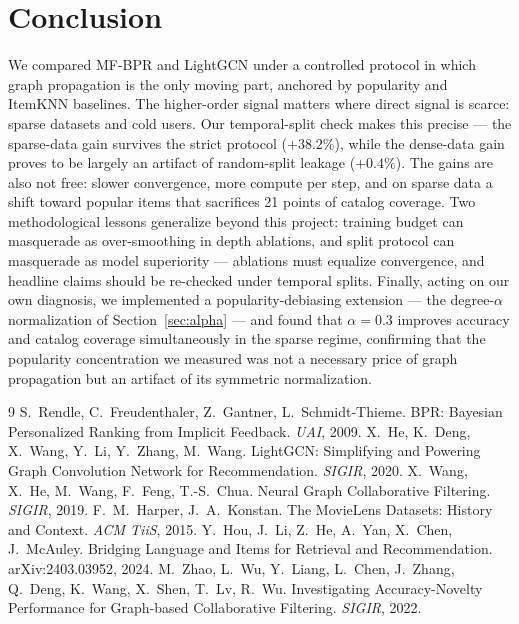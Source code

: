 \documentclass[11pt]{article}
\begin{document}
\section{Conclusion}

We compared MF-BPR and LightGCN under a controlled protocol in which graph
propagation is the only moving part, anchored by popularity and ItemKNN
baselines. The higher-order signal matters where direct signal is scarce:
sparse datasets and cold users. Our temporal-split check makes this precise
--- the sparse-data gain survives the strict protocol ($+38.2\%$), while the
dense-data gain proves to be largely an artifact of random-split leakage
($+0.4\%$). The gains are also not free: slower convergence, more compute per
step, and on sparse data a shift toward popular items that sacrifices 21
points of catalog coverage. Two methodological lessons generalize beyond this
project: training budget can masquerade as over-smoothing in depth ablations,
and split protocol can masquerade as model superiority --- ablations must
equalize convergence, and headline claims should be re-checked under temporal
splits. Finally, acting on our own diagnosis, we implemented a
popularity-debiasing extension --- the degree-$\alpha$ normalization of
Section~\ref{sec:alpha} --- and found that $\alpha{=}0.3$ improves accuracy
and catalog coverage simultaneously in the sparse regime, confirming that
the popularity concentration we measured was not a necessary price of graph
propagation but an artifact of its symmetric normalization.

\begin{thebibliography}{9}
 S.~Rendle, C.~Freudenthaler, Z.~Gantner, L.~Schmidt-Thieme.
BPR: Bayesian Personalized Ranking from Implicit Feedback. \emph{UAI}, 2009.
 X.~He, K.~Deng, X.~Wang, Y.~Li, Y.~Zhang, M.~Wang.
LightGCN: Simplifying and Powering Graph Convolution Network for
Recommendation. \emph{SIGIR}, 2020.
 X.~Wang, X.~He, M.~Wang, F.~Feng, T.-S.~Chua. Neural Graph
Collaborative Filtering. \emph{SIGIR}, 2019.
 F.~M.~Harper, J.~A.~Konstan. The MovieLens Datasets:
History and Context. \emph{ACM TiiS}, 2015.
 Y.~Hou, J.~Li, Z.~He, A.~Yan, X.~Chen, J.~McAuley.
Bridging Language and Items for Retrieval and Recommendation.
arXiv:2403.03952, 2024.
 M.~Zhao, L.~Wu, Y.~Liang, L.~Chen, J.~Zhang, Q.~Deng,
K.~Wang, X.~Shen, T.~Lv, R.~Wu. Investigating Accuracy-Novelty Performance
for Graph-based Collaborative Filtering. \emph{SIGIR}, 2022.
\end{thebibliography}
\end{document}
